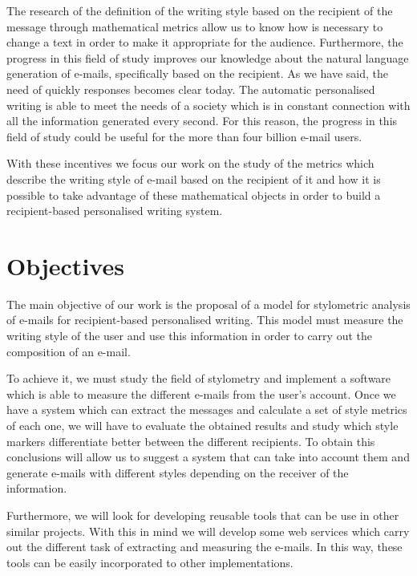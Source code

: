 The research of the definition of the writing style based on the recipient of the message through mathematical metrics allow us to know how is necessary to change a text in order to make it appropriate for the audience. Furthermore, the progress in this field of study improves our knowledge about the natural language generation of e-mails, specifically based on the recipient. As we have said, the need of quickly responses becomes clear today. The automatic personalised writing is able to meet the needs of a society which is in constant connection with all the information generated every second. For this reason, the progress in this field of study could be useful for the more than four billion e-mail users.

With these incentives we focus our work on the study of the metrics which describe the writing style of e-mail based on the recipient of it and how it is possible to take advantage of these mathematical objects in order to build a recipient-based personalised writing system.

\section{Objectives}\label{sect:obj}
The main objective of our work is the proposal of a model for stylometric analysis of e-mails for recipient-based personalised writing. This model must measure the writing style of the user and use this information in order to carry out the composition of an e-mail.

To achieve it, we must study the field of stylometry and implement a software which is able to measure the different e-mails from the user's account. Once we have a system which can extract the messages and calculate a set of style metrics of each one, we will have to evaluate the obtained results and study which style markers differentiate better between the different recipients. To obtain this conclusions will allow us to suggest a system that can take into account them and generate e-mails with different styles depending on the receiver of the information.

Furthermore, we will look for developing reusable tools that can be use in other similar projects. With this in mind we will develop some web services which carry out the different task of extracting and measuring the e-mails. In this way, these tools can be easily incorporated to other implementations.

